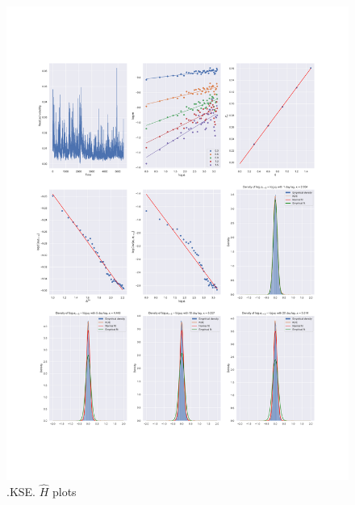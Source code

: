 	\begin{figure}[h]
		\centering
		\includegraphics[width=\linewidth]{fig/.KSE.pdf}
		\caption{.KSE. $\hat{H}$ plots}
	\end{figure}

